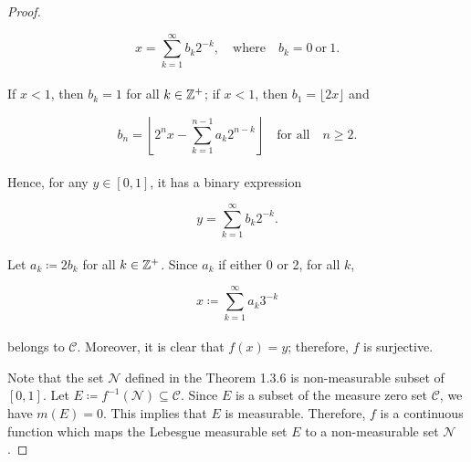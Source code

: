\documentclass[12pt, a4paper, openany, twoside]{book}
\theoremstyle{definition}
\theoremstyle{remark}
\theoremstyle{plain}
\numberwithin{equation}{section}
\begin{document}
\begin{proof}
\begin{enumerate}
        \[x=\sum_{k=1}^{\infty}{b_k2^{-k}},\quad\text{where}\quad b_k=0\ \text{or}\ 1.\]
        \\
        If $x<1$, then $b_k=1$ for all $k\in{\mathbb {Z}}^+$; if $x<1$, then $b_1=\lfloor 2x\rfloor$ and 

        \[b_n=\left\lfloor2^nx-\sum_{k=1}^{n-1}{a_k2^{n-k}}\right\rfloor\quad\text{for all}\quad n\geq 2.\]
        \\
        Hence, for any $y\in [0,1]$, it has a binary expression

        \[y=\sum_{k=1}^{\infty}{b_k2^{-k}}.\]
        \\
        Let $a_k\coloneqq 2b_k$ for all $k\in{\mathbb {Z}}^+$. Since $a_k$ if either 0 or 2, for all $k$, 
        
        \[x\coloneqq\sum_{k=1}^{\infty}{a_k3^{-k}}\]
        \\
        belongs to $\mathcal{C}$. Moreover, it is clear that $f(x)=y$; therefore, $f$ is surjective.
    \end{enumerate}
    \vspace{5mm}

    Note that the set $\mathcal{N}$ defined in the Theorem 1.3.6 is non-measurable subset of $[0,1]$. Let $E\coloneqq f^{-1}(\mathcal{N})\subseteq\mathcal{C}$. Since $E$ is a subset of the measure zero set $\mathcal{C}$, we have $m(E)=0$. This implies that $E$ is measurable. Therefore, $f$ is a continuous function which maps the Lebesgue measurable set $E$ to a non-measurable set $\mathcal{N}$.
\end{proof}

\newpage
\end{document}

